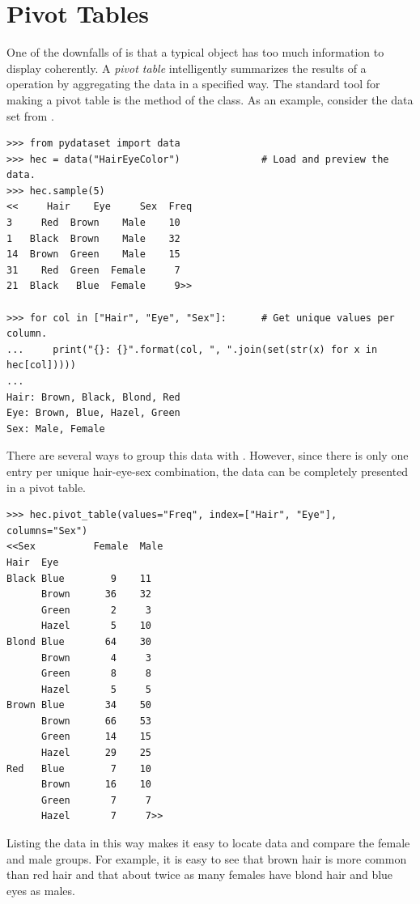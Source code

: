 \section*{Pivot Tables} %

One of the downfalls of  is that a typical  object has too much information to display coherently.
A \emph{pivot table} intelligently summarizes the results of a  operation by aggregating the data in a specified way.
The standard tool for making a pivot table is the  method of the  class.
As an example, consider the  data set from .

\begin{lstlisting}
>>> from pydataset import data
>>> hec = data("HairEyeColor")              # Load and preview the data.
>>> hec.sample(5)
<<     Hair    Eye     Sex  Freq
3     Red  Brown    Male    10
1   Black  Brown    Male    32
14  Brown  Green    Male    15
31    Red  Green  Female     7
21  Black   Blue  Female     9>>

>>> for col in ["Hair", "Eye", "Sex"]:      # Get unique values per column.
...     print("{}: {}".format(col, ", ".join(set(str(x) for x in hec[col]))))
...
Hair: Brown, Black, Blond, Red
Eye: Brown, Blue, Hazel, Green
Sex: Male, Female
\end{lstlisting}

There are several ways to group this data with .
However, since there is only one entry per unique hair-eye-sex combination, the data can be completely presented in a pivot table.

\begin{lstlisting}
>>> hec.pivot_table(values="Freq", index=["Hair", "Eye"], columns="Sex")
<<Sex          Female  Male
Hair  Eye
Black Blue        9    11
      Brown      36    32
      Green       2     3
      Hazel       5    10
Blond Blue       64    30
      Brown       4     3
      Green       8     8
      Hazel       5     5
Brown Blue       34    50
      Brown      66    53
      Green      14    15
      Hazel      29    25
Red   Blue        7    10
      Brown      16    10
      Green       7     7
      Hazel       7     7>>
\end{lstlisting}

Listing the data in this way makes it easy to locate data and compare the female and male groups.
For example, it is easy to see that brown hair is more common than red hair and that about twice as many females have blond hair and blue eyes as males.

